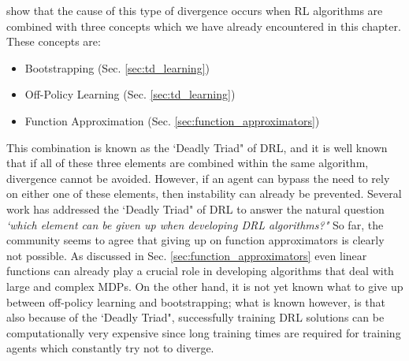 \citet{sutton2018reinforcement} show that the cause of this type of divergence occurs when RL algorithms are combined with three concepts which we have already encountered in this chapter. These concepts are:
\begin{itemize}
	\item Bootstrapping (Sec. \ref{sec:td_learning})
	\item Off-Policy Learning (Sec. \ref{sec:td_learning})
	\item Function Approximation (Sec. \ref{sec:function_approximators})
\end{itemize}
This combination is known as the `Deadly Triad" of DRL, and it is well known that if all of these three elements are combined within the same algorithm, divergence cannot be avoided. However, if an agent can bypass the need to rely on either one of these elements, then instability can already be prevented. Several work has addressed the `Deadly Triad" of DRL \cite{van2018deep_triad,hernandez2019understanding,fedus2020revisiting} to answer the natural question \textit{`which element can be given up when developing DRL algorithms?"} So far, the community seems to agree that giving up on function approximators is clearly not possible. As discussed in Sec. \ref{sec:function_approximators} even linear functions can already play a crucial role in developing algorithms that deal with large and complex MDPs. On the other hand, it is not yet known what to give up between off-policy learning and bootstrapping; what is known however, is that also because of the `Deadly Triad", successfully training DRL solutions can be computationally very expensive since long training times are required for training agents which constantly try not to diverge. 



